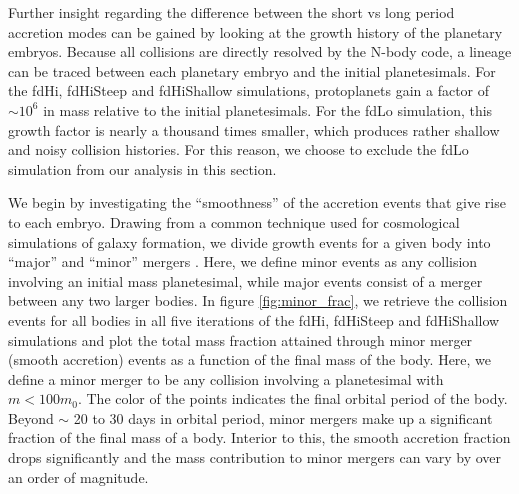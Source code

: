 Further insight regarding the difference between the short vs long period accretion modes can be gained by looking at the 
growth history of the planetary embryos. Because all collisions are directly resolved by the N-body code, a lineage can be 
traced between each planetary embryo and the initial
planetesimals. For the fdHi, fdHiSteep and fdHiShallow
  simulations, protoplanets gain a factor of $\sim 10^6$ in mass
  relative to the initial planetesimals. For the fdLo simulation, this growth factor is nearly a thousand times smaller, which produces rather shallow and noisy collision histories. For this reason, we choose to exclude the fdLo simulation from our analysis in this section.

We begin by investigating the ``smoothness'' of the accretion events
that give rise to each embryo. Drawing from a common technique used
for cosmological simulations of galaxy formation, we divide growth events for
a given body into ``major'' and ``minor'' mergers \cite{kauffmann93, murali02, lhullier12}. 
Here, we define minor events as any collision involving an initial mass 
planetesimal, while major events consist of a merger between any two larger bodies.
In figure \ref{fig:minor_frac}, we retrieve the collision events for all bodies in all five iterations of the fdHi, fdHiSteep and fdHiShallow
simulations and plot the total mass fraction attained through minor merger (smooth accretion) events as a function of the final mass of the body. Here, we define a minor merger
to be any collision involving a planetesimal with $m < 100 m_{0}$. The color of the
points indicates the final orbital period of the body. Beyond $\sim$ 20 to 30 days in orbital period, minor mergers make up a significant fraction of the final mass of a body. Interior to this, the smooth accretion fraction drops significantly and the mass contribution to minor mergers can vary by over an order of magnitude.

